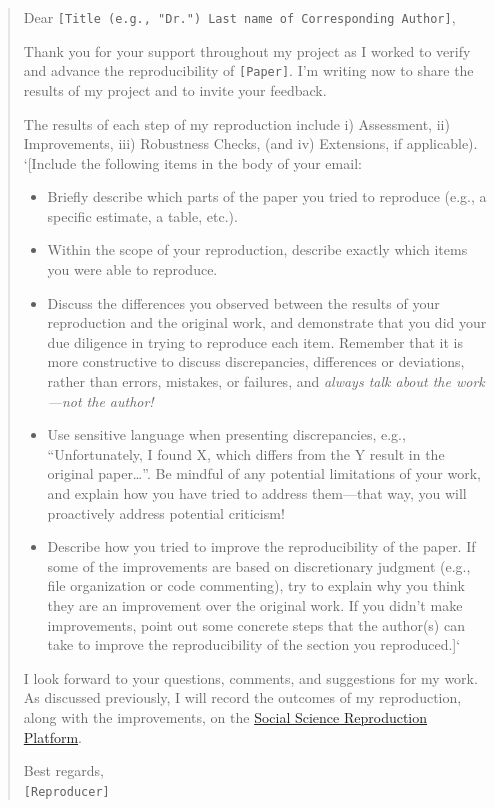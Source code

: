 \documentclass[
]{book}
\providecommand{\tightlist}{%
  \setlength{\itemsep}{0pt}\setlength{\parskip}{0pt}}
\begin{document}
\begin{quote}
Dear \texttt{{[}Title\ (e.g.,\ "Dr.")\ Last\ name\ of\ Corresponding\ Author{]}},

Thank you for your support throughout my project as I worked to verify and advance the reproducibility of \texttt{{[}Paper{]}}. I'm writing now to share the results of my project and to invite your feedback.

The results of each step of my reproduction include i) Assessment, ii) Improvements, iii) Robustness Checks, (and iv) Extensions, if applicable).\\
`{[}Include the following items in the body of your email:

\begin{itemize}
\tightlist
\item
  Briefly describe which parts of the paper you tried to reproduce (e.g., a specific estimate, a table, etc.).\\
\item
  Within the scope of your reproduction, describe exactly which items you were able to reproduce.\\
\item
  Discuss the differences you observed between the results of your reproduction and the original work, and demonstrate that you did your due diligence in trying to reproduce each item. Remember that it is more constructive to discuss discrepancies, differences or deviations, rather than errors, mistakes, or failures, and \emph{always talk about the work---not the author!}\\
\item
  Use sensitive language when presenting discrepancies, e.g., ``Unfortunately, I found X, which differs from the Y result in the original paper\ldots{}''. Be mindful of any potential limitations of your work, and explain how you have tried to address them---that way, you will proactively address potential criticism!\\
\item
  Describe how you tried to improve the reproducibility of the paper. If some of the improvements are based on discretionary judgment (e.g., file organization or code commenting), try to explain why you think they are an improvement over the original work. If you didn't make improvements, point out some concrete steps that the author(s) can take to improve the reproducibility of the section you reproduced.{]}`
\end{itemize}

I look forward to your questions, comments, and suggestions for my work. As discussed previously, I will record the outcomes of my reproduction, along with the improvements, on the \href{https://www.socialsciencereproduction.org/}{Social Science Reproduction Platform}.

Best regards,\\
\texttt{{[}Reproducer{]}}
\end{quote}
\end{document}
